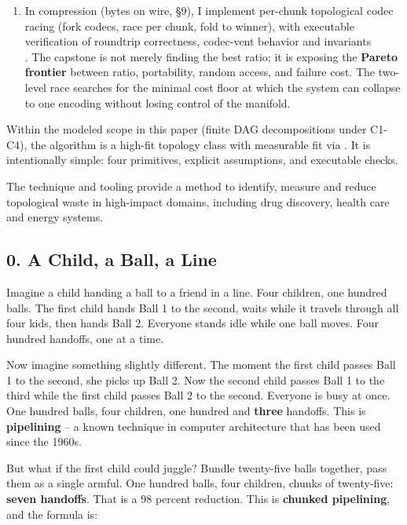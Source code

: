 \documentclass[
]{article}
\begin{document}
\begin{enumerate}
  header becomes the \textbf{coordinate chart} of the cover space.
  Head-of-line blocking is interpreted as a topological contradiction:
  independent paths forced to share a single dimension.\\
\item
  In compression (bytes on wire, §9), I implement per-chunk topological
  codec racing (fork codecs, race per chunk, fold to winner), with
  executable verification of roundtrip correctness, codec-vent behavior
  and invariants\\
  . The capstone is not merely finding the best ratio; it is exposing
  the \textbf{Pareto frontier} between ratio, portability, random
  access, and failure cost. The two-level race searches for the minimal
  cost floor at which the system can collapse to one encoding without
  losing control of the manifold.
\end{enumerate}

Within the modeled scope in this paper (finite DAG decompositions under
C1-C4), the algorithm is a high-fit topology class with measurable fit
via . It is intentionally simple: four primitives, explicit assumptions,
and executable checks.

The technique and tooling provide a method to identify, measure and
reduce topological waste in high-impact domains, including drug
discovery, health care and energy systems.

\subsection{\texorpdfstring{\textbf{0. A Child, a Ball, a
Line}}{0. A Child, a Ball, a Line}}\label{a-child-a-ball-a-line}

Imagine a child handing a ball to a friend in a line. Four children, one
hundred balls. The first child hands Ball 1 to the second, waits while
it travels through all four kids, then hands Ball 2. Everyone stands
idle while one ball moves. Four hundred handoffs, one at a time.

Now imagine something slightly different. The moment the first child
passes Ball 1 to the second, she picks up Ball 2. Now the second child
passes Ball 1 to the third while the first child passes Ball 2 to the
second. Everyone is busy at once. One hundred balls, four children, one
hundred and \textbf{three} handoffs. This is \textbf{pipelining} -- a
known technique in computer architecture that has been used since the
1960s.

But what if the first child could juggle? Bundle twenty-five balls
together, pass them as a single armful. One hundred balls, four
children, chunks of twenty-five: \textbf{seven handoffs}. That is a 98
percent reduction. This is \textbf{chunked pipelining}, and the formula
is:
\end{document}
